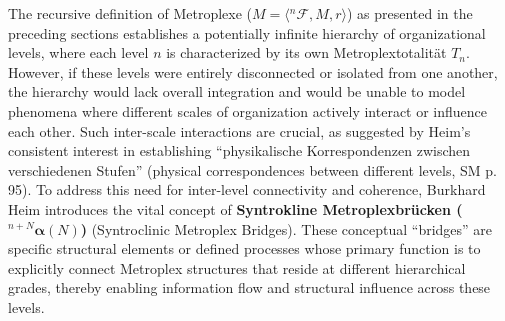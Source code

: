 \documentclass[12pt]{article}
\newcommand{\q}[1]{\enquote{#1}}
\def\metroplex#1#2{M}%
\newcommand{\hypermetrophor}[1]{%
  \metroplex{#1}{a}%
}
\newcommand{\metroplexsynkolator}[1]{{}^{#1}\mathcal{F}}
\newcommand{\metroplextotalitaet}[1]{T_{#1}}
\newcommand{\syntroklinebruecke}[1]{{}^{#1}\bm{\alpha}}
\begin{document}
The recursive definition of Metroplexe (\( \metroplex{n}{} = \langle\metroplexsynkolator{n}{}, \hypermetrophor{n-1}{}, r\rangle \)) as presented in the preceding sections establishes a potentially infinite hierarchy of organizational levels, where each level \(n\) is characterized by its own Metroplextotalität \( \metroplextotalitaet{n} \). However, if these levels were entirely disconnected or isolated from one another, the hierarchy would lack overall integration and would be unable to model phenomena where different scales of organization actively interact or influence each other. Such inter-scale interactions are crucial, as suggested by Heim's consistent interest in establishing \q{physikalische Korrespondenzen zwischen verschiedenen Stufen} (physical correspondences between different levels, SM p. 95). To address this need for inter-level connectivity and coherence, Burkhard Heim introduces the vital concept of \textbf{Syntrokline Metroplexbrücken (\(\syntroklinebruecke{n+N}(N)\))} (Syntroclinic Metroplex Bridges). These conceptual \q{bridges} are specific structural elements or defined processes whose primary function is to explicitly connect Metroplex structures that reside at different hierarchical grades, thereby enabling information flow and structural influence across these levels.
\end{document}
